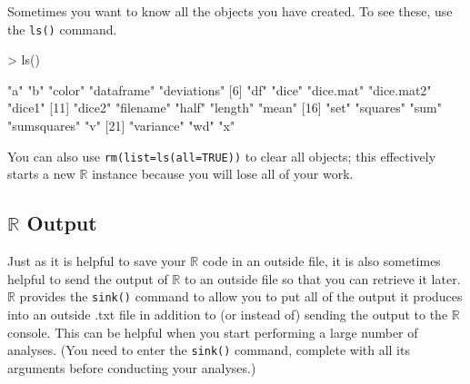 \documentclass[12pt]{article}
\begin{document}
Sometimes you want to know all the objects you have created. To see these, use the \verb|ls()| command.
\begin{Schunk}
\begin{Sinput}
> ls()
\end{Sinput}
\begin{Soutput}
 [1] "a"          "b"          "color"      "dataframe"  "deviations"
 [6] "df"         "dice"       "dice.mat"   "dice.mat2"  "dice1"     
[11] "dice2"      "filename"   "half"       "length"     "mean"      
[16] "set"        "squares"    "sum"        "sumsquares" "v"         
[21] "variance"   "wd"         "x"         
\end{Soutput}
\end{Schunk}
You can also use \verb|rm(list=ls(all=TRUE))| to clear all objects; this effectively starts a new $\mathbb{R}$ instance because you will lose all of your work.

\subsection{$\mathbb{R}$ Output}
Just as it is helpful to save your $\mathbb{R}$ code in an outside file, it is also sometimes helpful to send the output of $\mathbb{R}$ to an outside file so that you can retrieve it later. $\mathbb{R}$ provides the \verb|sink()| command to allow you to put all of the output it produces into an outside .txt file in addition to (or instead of) sending the output to the $\mathbb{R}$ console. This can be helpful when you start performing a large number of analyses. (You need to enter the \verb|sink()| command, complete with all its arguments before conducting your analyses.)
\end{document}
